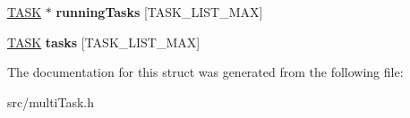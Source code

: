 \begin{DoxyCompactItemize}
\item 
\hypertarget{struct_t_a_s_k___c_t_l_a87459b911057e2c10882b80e1be06037}{}\hyperlink{struct_t_a_s_k}{T\+A\+S\+K} $\ast$ {\bfseries running\+Tasks} \mbox{[}T\+A\+S\+K\+\_\+\+L\+I\+S\+T\+\_\+\+M\+A\+X\mbox{]}\label{struct_t_a_s_k___c_t_l_a87459b911057e2c10882b80e1be06037}

\item 
\hypertarget{struct_t_a_s_k___c_t_l_a0580dbf90e68faf8d8aa913ef5cf8c22}{}\hyperlink{struct_t_a_s_k}{T\+A\+S\+K} {\bfseries tasks} \mbox{[}T\+A\+S\+K\+\_\+\+L\+I\+S\+T\+\_\+\+M\+A\+X\mbox{]}\label{struct_t_a_s_k___c_t_l_a0580dbf90e68faf8d8aa913ef5cf8c22}

\end{DoxyCompactItemize}


The documentation for this struct was generated from the following file\+:\begin{DoxyCompactItemize}
\item 
src/multi\+Task.\+h\end{DoxyCompactItemize}

